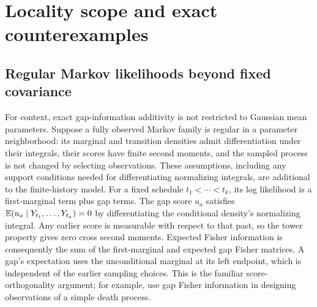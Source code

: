 \section{Locality scope and exact counterexamples}
\label{app:locality-scope}

\subsection{Regular Markov likelihoods beyond fixed covariance}
\label{app:markov-scope}
For context, exact gap-information additivity is not restricted to Gaussian
mean parameters. Suppose a fully observed Markov family is regular in a
parameter neighborhood: its marginal and transition densities admit
differentiation under their integrals, their scores have finite second
moments, and the sampled process is not changed by selecting observations.
These assumptions, including any support conditions needed for differentiating
normalizing integrals, are additional to the finite-history model.
For a fixed schedule $t_1<\cdots<t_k$, its log likelihood is a first-marginal
term plus gap terms. The gap score $u_a$ satisfies
$\mathbb E(u_a\mid Y_{t_1},\ldots,Y_{t_a})=0$ by differentiating the conditional
density's normalizing integral. Any earlier score is measurable with respect
to that past, so the tower property gives zero cross second moments.
Expected Fisher information is consequently the sum of the first-marginal
and expected gap Fisher matrices. A gap's expectation uses the unconditional
marginal at its left endpoint, which is independent of the earlier sampling
choices. This is the familiar score-orthogonality argument; for example,
\citet[Section 2]{Pagendam2010} use gap Fisher information in designing
observations of a simple death process.

